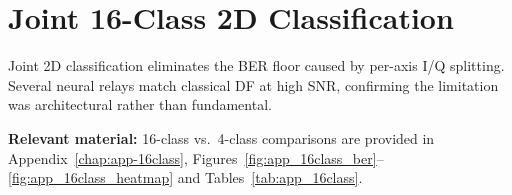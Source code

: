 \section{Joint 16-Class 2D Classification}
\label{sec:joint-classification}

Joint 2D classification eliminates the BER floor caused by per-axis I/Q splitting.
Several neural relays match classical DF at high SNR, confirming the limitation was architectural rather than fundamental.

\textbf{Relevant material:}
16-class vs.\ 4-class comparisons are provided in
Appendix~\ref{chap:app-16class},
Figures~\ref{fig:app_16class_ber}--\ref{fig:app_16class_heatmap}
and Tables~\ref{tab:app_16class}.